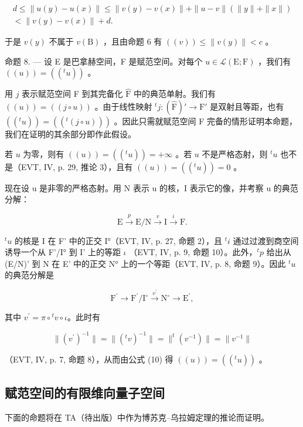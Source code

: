 \[
\begin{array}{c} d \leqslant \| u (y) - u (x) \| \leqslant \| v (y) - v (x) \| + \| u - v \| (\| y \| + \| x \|) \\ <   \| v (y) - v (x) \| + d. \end{array}
\]

于是 \(v(y)\) 不属于 \(v(\mathrm{B})\) ，且由命题 6 有 \(((v)) \leqslant \| v(y) \| < c\) 。

命题 8. --- 设 E 是巴拿赫空间，F 是赋范空间。对每个 \(u \in \mathcal{L}(\mathrm{E};\mathrm{F})\) ，我们有 \(((u)) = ((^t u))\) 。

用 \(j\) 表示赋范空间 F 到其完备化 \(\widehat{\mathrm{F}}\) 中的典范单射。我们有 \(((u)) = ((j \circ u))\) 。由于线性映射 \(^t j: (\widehat{\mathrm{F}})' \to \mathrm{F}'\) 是双射且等距，也有 \(((^t u)) = ((^t (j \circ u)))\) 。因此只需就赋范空间 F 完备的情形证明本命题，我们在证明的其余部分即作此假设。

若 \(u\) 为零，则有 \(((u)) = ((^t u)) = +\infty\) 。若 \(u\) 不是严格态射，则 \(^t u\) 也不是（EVT, IV, p. 29, 推论 3），且有 \(((u)) = ((^t u)) = 0\) 。

现在设 u 是非零的严格态射。用 N 表示 u 的核，I 表示它的像，并考察 u 的典范分解：

\[
\mathrm{E} \xrightarrow {p} \mathrm{E/N} \xrightarrow {v} \mathrm{I} \xrightarrow {i} \mathrm{F}.
\]

\(^{t}u\) 的核是 I 在 F' 中的正交 I°（EVT, IV, p. 27, 命题 2），且 \(^{t}i\) 通过过渡到商空间诱导一个从 F'/I° 到 I' 上的等距 \(\iota\) （EVT, IV, p. 9, 命题 10）。此外，\(^{t}p\) 给出从 (E/N)' 到 N 在 E' 中的正交 N° 上的一个等距（EVT, IV, p. 8, 命题 9）。因此 \(^{t}u\) 的典范分解是

\[
\mathrm{F} ^ {\prime} \longrightarrow \mathrm{F} ^ {\prime} / \mathrm{I} ^ {\circ} \stackrel {v ^ {\prime}} {\longrightarrow} \mathrm{N} ^ {\circ} \longrightarrow \mathrm{E} ^ {\prime},
\]

其中 \(v^{\prime} = \pi \circ{}^{t}v\circ \iota\)。此时有

\[
\| (v ^ {\prime}) ^ {- 1} \| = \| (^ {t} v) ^ {- 1} \| = \| ^ {t} (v ^ {- 1}) \| = \| v ^ {- 1} \|
\]

（EVT, IV, p. 7, 命题 8），从而由公式 (10) 得 \(((u)) = ((^t u))\) 。

\subsection{赋范空间的有限维向量子空间}

下面的命题将在 TA（待出版）中作为博苏克–乌拉姆定理的推论而证明。

